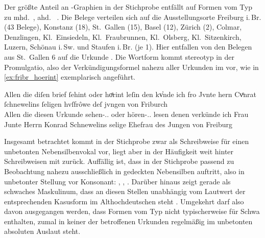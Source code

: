 Der größte Anteil an -Graphien in der Stichprobe entfällt auf Formen vom
Typ  zu mhd.~, ahd.~ . Die Belege verteilen sich auf die Ausstellungsorte Freiburg
i.\,Br. (43 Belege), Konstanz (18), St.~Gallen (15), Basel (12), Zürich (2),
Colmar, Denzlingen, Kl.~Einsiedeln, Kl.~Fraubrunnen, Kl.~Olsberg,
Kl.~Sitzenkirch, Luzern, Schönau i.\,Sw. und Staufen i.\,Br. (je 1). Hier
entfallen von den Belegen aus St.~Gallen 6 auf die Urkunde
 \autocites(St.~Gallen, 1284){cao2}. Die Wortform
 kommt stereotyp in der Promulgatio, also der Verkündigungsformel
nahezu aller Urkunden im  vor, wie in \cref{ex:fribr_hoerint}
exemplarisch angeführt.

\begin{exe}
\ex\label{ex:fribr_hoerint}
	\setlength{\glossglue}{5pt plus 2pt minus 2pt}
	\gll Allen die diſen brief ſehint oder hoͤrint leſin den kv̓nde ich fro
			Jvnte hern Cvͦnrat ſchnewelins ſeligen hvſfrôwe deſ jvngen von
			Friburch \textelp{} \\
		Allen die diesen Urkunde sehen-\Tpl.\Ind.\Prs{} oder
			hören-\Tpl.\Ind.\Prs{} lesen denen verkünde ich Frau Junte Herrn
			Konrad Schnewelins selige Ehefrau des Jungen von Freiburg \\
	\begin{taggedline}{\autocites(Freiburg i.\,Br., 1277)[\pno~328, 314.33--34]{cao1}}
	\trans {}
	\end{taggedline}
\end{exe}

Insgesamt betrachtet kommt  in der Stichprobe zwar als Schreibweise für
einen unbetonten Nebensilbenvokal vor, liegt aber in der Häufigkeit weit hinter
Schreibweisen mit  zurück. Auffällig ist, dass  in der Stichprobe
passend zu  Beobachtung nahezu
ausschließlich in gedeckten Nebensilben auftritt, also in unbetonter Stellung
vor Konsonant: , ,
. Darüber hinaus zeigt gerade   als schwaches Maskulinum, dass  an diesen Stellen unabhängig vom
Lautwert der entsprechenden Kasusform im Althochdeutschen steht
\autocite[vgl.][282--283]{braune2018}. Umgekehrt darf also davon ausgegangen
werden, dass Formen vom Typ   nicht typischerweise
 für Schwa enthalten, zumal in keiner der betroffenen Urkunden
\autocites[\ppno~81, 190]{cao1}[\pno~N~230]{cao5} regelmäßig  im
unbetonten absoluten Auslaut steht.


